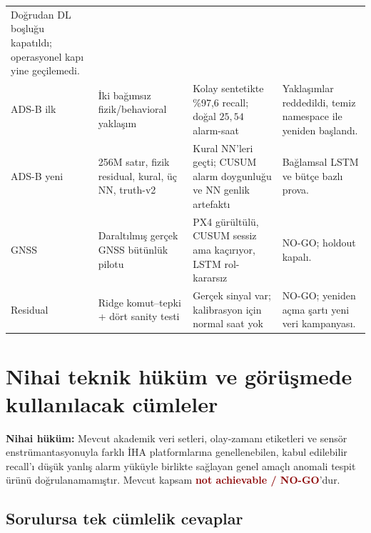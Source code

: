 \documentclass[10pt,a4paper]{article}
\newcommand{\bad}[1]{\textcolor{darkred}{\textbf{#1}}}
\begin{document}
\begin{longtable}{p{}p{}p{}p{}}
Doğrudan DL boşluğu kapatıldı; operasyonel kapı yine geçilemedi. \\
ADS-B ilk & İki bağımsız fizik/behavioral yaklaşım &
Kolay sentetikte \%97,6 recall; doğal $25{,}54$ alarm-saat &
Yaklaşımlar reddedildi, temiz namespace ile yeniden başlandı. \\
ADS-B yeni & 256M satır, fizik residual, kural, üç NN, truth-v2 &
Kural NN'leri geçti; CUSUM alarm doygunluğu ve NN genlik artefaktı &
Bağlamsal LSTM ve bütçe bazlı prova. \\
GNSS & Daraltılmış gerçek GNSS bütünlük pilotu &
PX4 gürültülü, CUSUM sessiz ama kaçırıyor, LSTM rol-kararsız &
NO-GO; holdout kapalı. \\
Residual & Ridge komut--tepki + dört sanity testi &
Gerçek sinyal var; kalibrasyon için normal saat yok &
NO-GO; yeniden açma şartı yeni veri kampanyası. \\
\bottomrule
\end{longtable}

\section{Nihai teknik hüküm ve görüşmede kullanılacak cümleler}

\begin{verdictbox}
\textbf{Nihai hüküm:} Mevcut akademik veri setleri, olay-zamanı etiketleri ve
sensör enstrümantasyonuyla farklı İHA platformlarına genellenebilen, kabul
edilebilir recall'ı düşük yanlış alarm yüküyle birlikte sağlayan genel amaçlı
anomali tespit ürünü doğrulanamamıştır. Mevcut kapsam \bad{not achievable / NO-GO}'dur.
\end{verdictbox}

\subsection*{Sorulursa tek cümlelik cevaplar}
\end{document}
